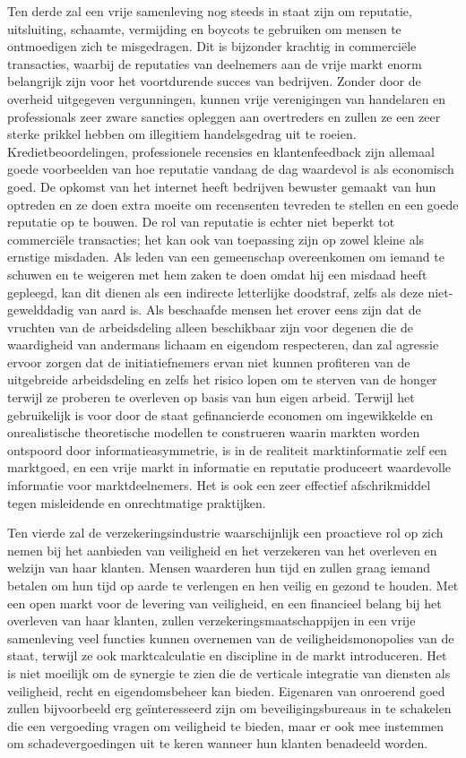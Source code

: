 Ten derde zal een vrije samenleving nog steeds in staat zijn om reputatie, uitsluiting, schaamte, vermijding en boycots te gebruiken om mensen te ontmoedigen zich te misgedragen. Dit is bijzonder krachtig in commerciële transacties, waarbij de reputaties van deelnemers aan de vrije markt enorm belangrijk zijn voor het voortdurende succes van bedrijven. Zonder door de overheid uitgegeven vergunningen, kunnen vrije verenigingen van handelaren en professionals zeer zware sancties opleggen aan overtreders en zullen ze een zeer sterke prikkel hebben om illegitiem handelsgedrag uit te roeien. Kredietbeoordelingen, professionele recensies en klantenfeedback zijn allemaal goede voorbeelden van hoe reputatie vandaag de dag waardevol is als economisch goed. De opkomst van het internet heeft bedrijven bewuster gemaakt van hun optreden en ze doen extra moeite om recensenten tevreden te stellen en een goede reputatie op te bouwen. De rol van reputatie is echter niet beperkt tot commerciële transacties; het kan ook van toepassing zijn op zowel kleine als ernstige misdaden. Als leden van een gemeenschap overeenkomen om iemand te schuwen en te weigeren met hem zaken te doen omdat hij een misdaad heeft gepleegd, kan dit dienen als een indirecte letterlijke doodstraf, zelfs als deze niet-gewelddadig van aard is. Als beschaafde mensen het erover eens zijn dat de vruchten van de arbeidsdeling alleen beschikbaar zijn voor degenen die de waardigheid van andermans lichaam en eigendom respecteren, dan zal agressie ervoor zorgen dat de initiatiefnemers ervan niet kunnen profiteren van de uitgebreide arbeidsdeling en zelfs het risico lopen om te sterven van de honger terwijl ze proberen te overleven op basis van hun eigen arbeid. Terwijl het gebruikelijk is voor door de staat gefinancierde economen om ingewikkelde en onrealistische theoretische modellen te construeren waarin markten worden ontspoord door informatieasymmetrie, is in de realiteit marktinformatie zelf een marktgoed, en een vrije markt in informatie en reputatie produceert waardevolle informatie voor marktdeelnemers. Het is ook een zeer effectief afschrikmiddel tegen misleidende en onrechtmatige praktijken.

Ten vierde zal de verzekeringsindustrie waarschijnlijk een proactieve rol op zich nemen bij het aanbieden van veiligheid en het verzekeren van het overleven en welzijn van haar klanten. Mensen waarderen hun tijd en zullen graag iemand betalen om hun tijd op aarde te verlengen en hen veilig en gezond te houden. Met een open markt voor de levering van veiligheid, en een financieel belang bij het overleven van haar klanten, zullen verzekeringsmaatschappijen in een vrije samenleving veel functies kunnen overnemen van de veiligheidsmonopolies van de staat, terwijl ze ook marktcalculatie en discipline in de markt introduceren. Het is niet moeilijk om de synergie te zien die de verticale integratie van diensten als veiligheid, recht en eigendomsbeheer kan bieden. Eigenaren van onroerend goed zullen bijvoorbeeld erg geïnteresseerd zijn om beveiligingsbureaus in te schakelen die een vergoeding vragen om veiligheid te bieden, maar er ook mee instemmen om schadevergoedingen uit te keren wanneer hun klanten benadeeld worden.

